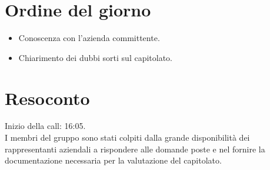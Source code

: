 \section{Ordine del giorno}
\begin{itemize}
    \item Conoscenza con l'azienda committente.
    \item Chiarimento dei dubbi sorti sul capitolato.
\end{itemize}

\section{Resoconto}
Inizio della call: 16:05.\\
I membri del gruppo sono stati colpiti dalla grande disponibilità dei rappresentanti aziendali a 
rispondere alle domande poste e nel fornire la documentazione necessaria per la valutazione del capitolato.

